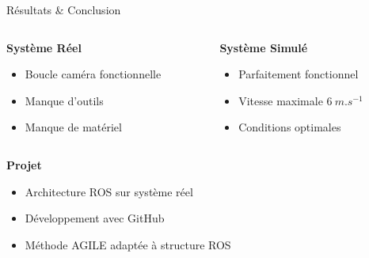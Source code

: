 \documentclass[french]{beamer}
\begin{document}
    \begin{frame}{Résultats \& Conclusion}
        \vspace{0.8cm}
        \begin{columns}[c]
            \begin{column}{0.50\textwidth}
                \centering
                \textbf{Système Réel}
                \begin{itemize}
                    \item Boucle caméra fonctionnelle
                    \item Manque d'outils
                    \item Manque de matériel
                \end{itemize}
            \end{column}
            \vrule{}
            \begin{column}{0.50\textwidth}
                \centering
                \textbf{Système Simulé}
                \begin{itemize}
                    \item Parfaitement fonctionnel
                    \item Vitesse maximale $6~m.s^{-1}$
                    \item Conditions optimales
                \end{itemize}
            \end{column}
        \end{columns}
        \vspace{0.5cm}

        \textbf{Projet}
        \vspace{-0.3cm}
        \begin{itemize}
            \item Architecture ROS sur système réel
            \item Développement avec GitHub
            \item Méthode AGILE adaptée à structure ROS
        \end{itemize}

    \end{frame}
\end{document}
